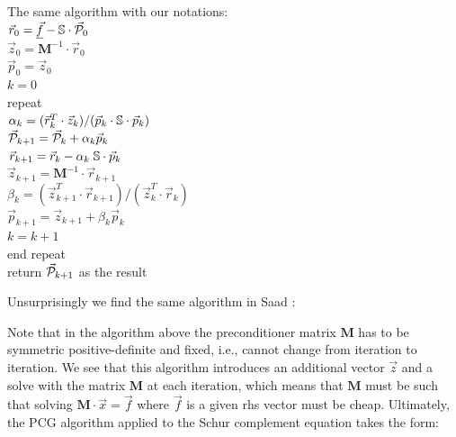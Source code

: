 \begin{minipage}{0.50\textwidth}
The same algorithm with our notations:\\
$\vec{r}_0 = \underline{\vec{f}} - {\mathbb{S}} \cdot \vec{\cal P}_0$\\
$\vec{z}_0= {\bm M}^{-1} \cdot \vec{r}_0$ \\
$\vec{p}_0 = \vec{z}_0$\\
$k=0$ \\
repeat\\
\hspace{8mm} $\alpha_k = (\vec{r}_k^T\cdot \vec{z}_k )/(\vec{p}_k \cdot {\mathbb{S}}\cdot  \vec{p}_k )$\\
\hspace{8mm} $\vec{\cal P}_{k+1} = \vec{\cal P}_k+\alpha_k \vec{p}_k$\\
\hspace{8mm} $\vec{r}_{k+1} = \vec{r}_k - \alpha_k \; {\mathbb{S}} \cdot \vec{p}_k $ \\
\hspace{8mm} $\vec{z}_{k+1} = {\bm M}^{-1} \cdot \vec{r}_{k+1}$ \\
\hspace{8mm} $\beta_k=(\vec{z}_{k+1}^T \cdot \vec{r}_{k+1})/(\vec{z}_k^T \cdot \vec{r}_k)$ \\
\hspace{8mm} $\vec{p}_{k+1} =\vec{z}_{k+1}+ \beta_k \vec{p}_k$ \\
$k=k+1$ \\
end repeat\\
return $\vec{\cal P}_{k+1}$ as the result
\end{minipage}

\vspace{.5cm}

Unsurprisingly we find the same algorithm in Saad \cite{saad}:


Note that in the algorithm above the preconditioner matrix ${\bm M}$ 
has to be symmetric positive-definite and fixed, i.e., cannot change from iteration to iteration. 
We see that this algorithm introduces an additional vector $\vec{z}$ and a solve with the 
matrix ${\bm M}$ at each iteration, which means that ${\bm M}$ must 
be such that solving ${\bm M}\cdot \vec{x}= \vec{f}$ 
where $\vec{f}$ is a given rhs vector must be cheap. Ultimately, the PCG algorithm applied to 
the Schur complement equation takes the form:

